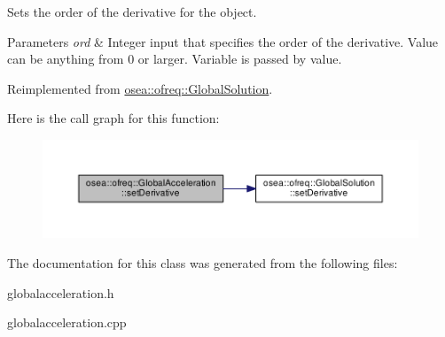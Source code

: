 Sets the order of the derivative for the object. 


\begin{DoxyParams}{Parameters}
{\em ord} & Integer input that specifies the order of the derivative. Value can be anything from 0 or larger. Variable is passed by value. \\
\hline
\end{DoxyParams}


Reimplemented from \hyperlink{classosea_1_1ofreq_1_1_global_solution_a537163391f1f55d073720b20f69acfa5}{osea\-::ofreq\-::\-Global\-Solution}.



Here is the call graph for this function\-:\nopagebreak
\begin{figure}[H]
\begin{center}
\leavevmode
\includegraphics[width=350pt]{classosea_1_1ofreq_1_1_global_acceleration_a14a041ea42d4c1bc10211c9a44aa3431_cgraph}
\end{center}
\end{figure}




The documentation for this class was generated from the following files\-:\begin{DoxyCompactItemize}
\item 
globalacceleration.\-h\item 
globalacceleration.\-cpp\end{DoxyCompactItemize}

